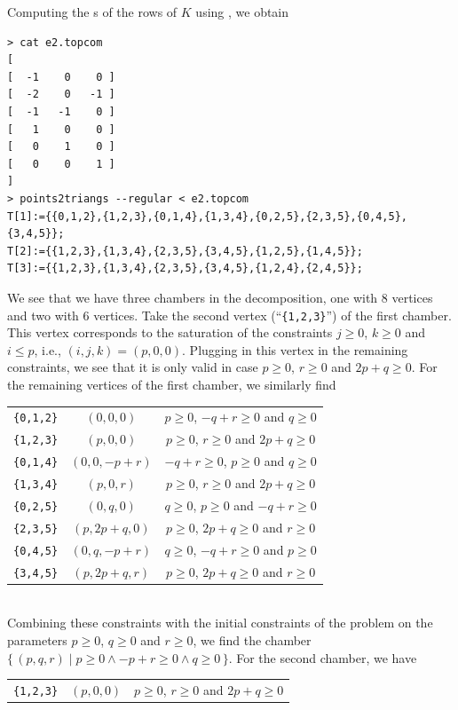 \begin{example}
Computing the s of the rows of $K$
using , we obtain
\begin{verbatim}
> cat e2.topcom
[
[  -1    0    0 ]
[  -2    0   -1 ]
[  -1   -1    0 ]
[   1    0    0 ]
[   0    1    0 ]
[   0    0    1 ]
]
> points2triangs --regular < e2.topcom 
T[1]:={{0,1,2},{1,2,3},{0,1,4},{1,3,4},{0,2,5},{2,3,5},{0,4,5},{3,4,5}};
T[2]:={{1,2,3},{1,3,4},{2,3,5},{3,4,5},{1,2,5},{1,4,5}};
T[3]:={{1,2,3},{1,3,4},{2,3,5},{3,4,5},{1,2,4},{2,4,5}};
\end{verbatim}

We see that we have three chambers in the decomposition,
one with 8 vertices and two with 6 vertices.
Take the second vertex (``\verb+{1,2,3}+'') of the first chamber.
This vertex corresponds
to the saturation of the constraints $j \ge 0$, $k \ge 0$
and $i \le p$, i.e., $(i,j,k) = (p,0,0)$.  Plugging in this
vertex in the remaining constraints, we see that it is only valid
in case $p \ge 0$, $r \ge 0$ and $2p + q \ge 0$.
For the remaining vertices of the first chamber, we similarly find
\\
\begin{tabular}{ccc}
\verb+{0,1,2}+ & $(0,0,0)$ & $p \ge 0$, $-q + r \ge 0$ and $q \ge 0$
\\
\verb+{1,2,3}+ & $(p,0,0)$ & $p \ge 0$, $r \ge 0$ and $2p + q \ge 0$
\\
\verb+{0,1,4}+ & $(0,0,-p+r)$ & $-q + r \ge 0$, $p \ge 0$ and $q \ge 0$
\\
\verb+{1,3,4}+ & $(p,0,r)$ & $p \ge 0$, $r \ge 0$ and $2p + q \ge 0$
\\
\verb+{0,2,5}+ & $(0,q,0)$ & $q \ge 0$, $p \ge 0$ and $-q + r \ge 0$
\\
\verb+{2,3,5}+ & $(p, 2p+q, 0)$ & $p \ge 0$, $2p + q \ge 0$ and $r \ge 0$
\\
\verb+{0,4,5}+ & $(0, q, -p+r)$ & $q \ge 0$, $-q + r \ge 0$ and $p \ge 0$
\\
\verb+{3,4,5}+ & $(p, 2p+q, r)$ & $p \ge 0$, $2p + q \ge 0$ and $r \ge 0$
\end{tabular}
\\
Combining these constraints with the initial constraints of the problem
on the parameters
$p \ge 0$, $q \ge 0$ and $r \ge 0$, we find the chamber
$
\{\,
(p,q,r) \mid p \ge 0 \wedge -p + r \ge 0 \wedge q \ge 0
\,\}
$.
For the second chamber, we have
\\
\begin{tabular}{ccc}
\verb+{1,2,3}+ & $(p,0,0)$ & $p \ge 0$, $r \ge 0$ and $2p + q \ge 0$

\end{tabular}
\end{example}
